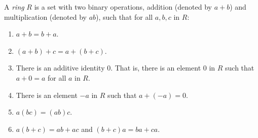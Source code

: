 
\begin{definition}[Ring]
	A \textit{ring} $R$ is a set with two binary operations, addition (denoted by $a + b$) and multiplication (denoted by $ab$), such that for all $a,b,c$ in $R$:
	\begin{enumerate}
		\item $a + b = b + a$.
		\item $(a + b) + c = a + (b + c)$.
		\item There is an additive identity 0. That is, there is an element 0 in $R$ such that $a + 0 = a$ for all $a$ in $R$.
		\item There is an element $-a$ in $R$ such that $a + (-a) = 0$.
		\item $a(bc) = (ab)c$.
		\item $a(b+c) = ab + ac$ and $(b + c)a = ba + ca$.
	\end{enumerate}
\end{definition}


